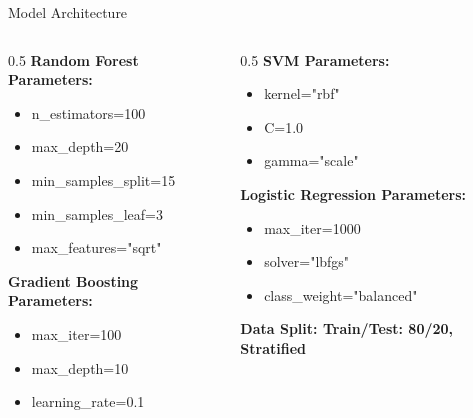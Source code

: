 \documentclass[aspectratio=169]{beamer}
\begin{document}
\begin{frame}{Model Architecture}
\begin{columns}
\begin{column}{0.5\textwidth}
\textbf{Random Forest Parameters:}
\begin{itemize}
    \item n\_estimators=100
    \item max\_depth=20
    \item min\_samples\_split=15
    \item min\_samples\_leaf=3
    \item max\_features="sqrt"
\end{itemize}
\bigskip
\textbf{Gradient Boosting Parameters:}
\begin{itemize}
    \item max\_iter=100
    \item max\_depth=10
    \item learning\_rate=0.1
\end{itemize}
\bigskip
\end{column}
\begin{column}{0.5\textwidth}
\textbf{SVM Parameters:}
\begin{itemize}
    \item kernel="rbf"
    \item C=1.0
    \item gamma="scale"
\end{itemize}
\textbf{Logistic Regression Parameters:}
\begin{itemize}
    \item max\_iter=1000
    \item solver="lbfgs"
    \item class\_weight="balanced"
\end{itemize}
\bigskip
\textbf{Data Split: Train/Test: 80/20, Stratified}
\end{column}
\end{columns}
\end{frame}
\end{document}
